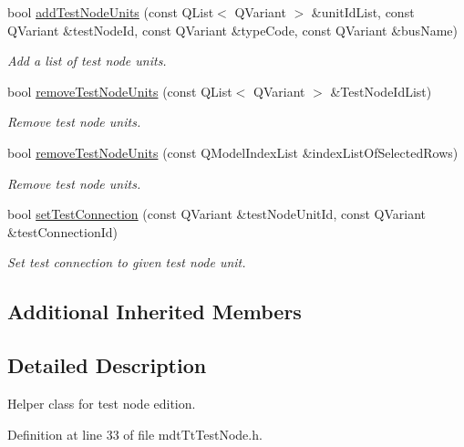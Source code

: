 \begin{DoxyCompactItemize}
bool \hyperlink{classmdt_tt_test_node_a5057a13fb3d7fababcbebccf82ee3ed6}{add\-Test\-Node\-Units} (const Q\-List$<$ Q\-Variant $>$ \&unit\-Id\-List, const Q\-Variant \&test\-Node\-Id, const Q\-Variant \&type\-Code, const Q\-Variant \&bus\-Name)
\begin{DoxyCompactList}\small\item\em Add a list of test node units. \end{DoxyCompactList}\item 
bool \hyperlink{classmdt_tt_test_node_a961a9fedcce41ac28fc0eb616a8968cf}{remove\-Test\-Node\-Units} (const Q\-List$<$ Q\-Variant $>$ \&Test\-Node\-Id\-List)
\begin{DoxyCompactList}\small\item\em Remove test node units. \end{DoxyCompactList}\item 
bool \hyperlink{classmdt_tt_test_node_a86209521bed056b11a27431a19cd4747}{remove\-Test\-Node\-Units} (const Q\-Model\-Index\-List \&index\-List\-Of\-Selected\-Rows)
\begin{DoxyCompactList}\small\item\em Remove test node units. \end{DoxyCompactList}\item 
bool \hyperlink{classmdt_tt_test_node_a63a7f4a4509de45526303f92c4bdbf83}{set\-Test\-Connection} (const Q\-Variant \&test\-Node\-Unit\-Id, const Q\-Variant \&test\-Connection\-Id)
\begin{DoxyCompactList}\small\item\em Set test connection to given test node unit. \end{DoxyCompactList}\end{DoxyCompactItemize}
\subsection*{Additional Inherited Members}


\subsection{Detailed Description}
Helper class for test node edition. 

Definition at line 33 of file mdt\-Tt\-Test\-Node.\-h.



